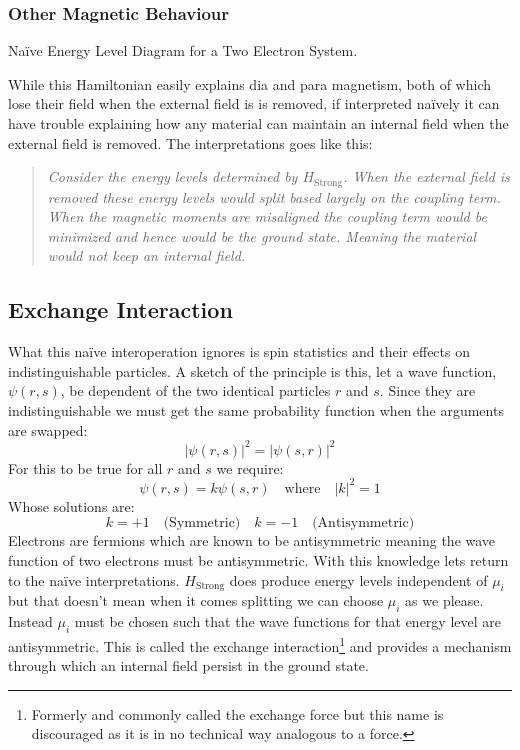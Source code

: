 \subsubsection{Other Magnetic Behaviour}
\begin{center}

Naïve Energy Level Diagram for a Two Electron System.
\end{center}
While this Hamiltonian easily explains dia and para magnetism,
both of which lose their field when the external field is is removed,
if interpreted naïvely it can have trouble explaining how any material can maintain an internal field when the external field is removed.
The interpretations goes like this:
\begin{quote}
\em Consider the energy levels determined by $H_\text{Strong}$.
When the external field is removed these energy levels would split based largely on the coupling term.
When the magnetic moments are misaligned the coupling term would be minimized and hence would be the ground state.
Meaning the material would not keep an internal field.
\end{quote}

\subsection{Exchange Interaction}
What this naïve interoperation ignores is spin statistics and their effects on indistinguishable particles.
A sketch of the principle is this, 
let a wave function, $\psi(r,s)$, be dependent of the two identical particles $r$ and $s$.
Since they are indistinguishable we must get the same probability function when the arguments are swapped:
\[|\psi(r,s)|^2=|\psi(s,r)|^2\]
For this to be true for all $r$ and $s$ we require:
\[\psi(r,s) = k\psi(s,r)\quad\text{where}\quad |k|^2=1\]
Whose solutions are:
\[k=+1\quad\text{(Symmetric)}\quad k=-1\quad\text{(Antisymmetric)}\]
Electrons are fermions which are known to be antisymmetric meaning the wave function of two electrons must be antisymmetric. 
With this knowledge lets return to the naïve interpretations.
$H_\text{Strong}$ does produce energy levels independent of $\mu_i$ but that doesn't mean when it comes splitting we can choose $\mu_i$ as we please.
Instead $\mu_i$ must be chosen such that the wave functions for that energy level are antisymmetric.
This is called the exchange interaction\footnote{Formerly and commonly called the exchange force but this name is discouraged as it is in no technical way analogous to a force.} and provides a mechanism through which an internal field persist in the ground state.

